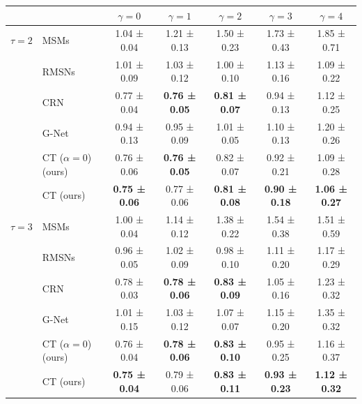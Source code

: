 \begin{tabular}{ll|ccccc}
\toprule
           &           &          $\gamma = 0$ &          $\gamma = 1$ &          $\gamma = 2$ &          $\gamma = 3$ &          $\gamma = 4$ \\
\midrule
$\tau = 2$ & MSMs &           1.04 ± 0.04 &           1.21 ± 0.13 &           1.50 ± 0.23 &           1.73 ± 0.43 &           1.85 ± 0.71 \\
           & RMSNs &           1.01 ± 0.09 &           1.03 ± 0.12 &           1.00 ± 0.10 &           1.13 ± 0.16 &           1.09 ± 0.22 \\
           & CRN &           0.77 ± 0.04 &  \textbf{0.76 ± 0.05} &  \textbf{0.81 ± 0.07} &           0.94 ± 0.13 &           1.12 ± 0.25 \\
\vspace{0.9mm}
           & G-Net &           0.94 ± 0.13 &           0.95 ± 0.09 &           1.01 ± 0.05 &           1.10 ± 0.13 &           1.20 ± 0.26 \\
           & CT ($\alpha = 0$) (ours) &           0.76 ± 0.06 &  \textbf{0.76 ± 0.05} &           0.82 ± 0.07 &           0.92 ± 0.21 &           1.09 ± 0.28 \\
           & CT (ours) &  \textbf{0.75 ± 0.06} &           0.77 ± 0.06 &  \textbf{0.81 ± 0.08} &  \textbf{0.90 ± 0.18} &  \textbf{1.06 ± 0.27} \\
\midrule
$\tau = 3$ & MSMs &           1.00 ± 0.04 &           1.14 ± 0.12 &           1.38 ± 0.22 &           1.54 ± 0.38 &           1.51 ± 0.59 \\
           & RMSNs &           0.96 ± 0.05 &           1.02 ± 0.09 &           0.98 ± 0.10 &           1.11 ± 0.20 &           1.17 ± 0.29 \\
           & CRN &           0.78 ± 0.03 &  \textbf{0.78 ± 0.06} &  \textbf{0.83 ± 0.09} &           1.05 ± 0.16 &           1.23 ± 0.32 \\
\vspace{0.9mm}
           & G-Net &           1.01 ± 0.15 &           1.03 ± 0.12 &           1.07 ± 0.07 &           1.15 ± 0.20 &           1.35 ± 0.32 \\
           & CT ($\alpha = 0$) (ours) &           0.76 ± 0.04 &  \textbf{0.78 ± 0.06} &  \textbf{0.83 ± 0.10} &           0.95 ± 0.25 &           1.16 ± 0.37 \\
           & CT (ours) &  \textbf{0.75 ± 0.04} &           0.79 ± 0.06 &  \textbf{0.83 ± 0.11} &  \textbf{0.93 ± 0.23} &  \textbf{1.12 ± 0.32} \\

\end{tabular}
